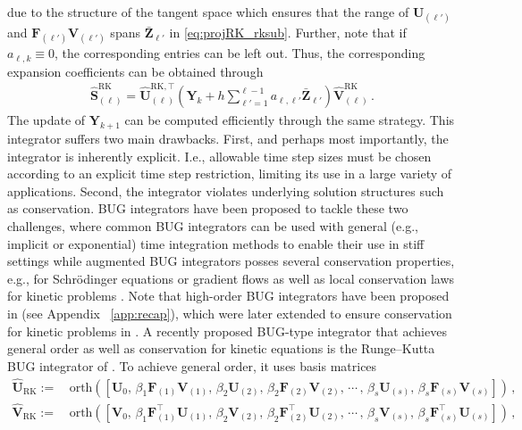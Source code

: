 \documentclass[preprint,runningheads]{svjour3}
\newcommand\bfF{{\mathbf F}}
\newcommand\bfS{{\mathbf S}}
\newcommand\bfU{{\mathbf U}}
\newcommand\bfV{{\mathbf V}}
\newcommand\bfY{{\mathbf Y}}
\newcommand\bfZ{{\mathbf Z}}
\begin{document}
due to the structure of the tangent space which ensures that the range of $\bfU_{(\ell')}$ and $\bfF_{(\ell')}\bfV_{(\ell')}$ spans $\bar \bfZ_{\ell'}$ in \eqref{eq:projRK_rksub}. Further, note that if $a_{\ell,k} \equiv 0$, the corresponding entries can be left out. Thus, the corresponding expansion coefficients can be obtained through
\begin{align*}
    \widehat\bfS_{(\ell)}^{\mathrm{RK}} = \widehat\bfU_{(\ell)}^{\mathrm{RK},\top} \left( \bfY_k + h\sum_{\ell' = 1}^{\ell-1}a_{\ell,\ell'}\bar \bfZ_{\ell'}\right) \widehat\bfV_{(\ell)}^{\mathrm{RK}}\,.
\end{align*}
 {The update of $\bfY_{k+1}$ can be computed efficiently through the same strategy.} This integrator suffers two main drawbacks. First, and perhaps most importantly, the integrator is inherently explicit. I.e., allowable time step sizes must be chosen according to an explicit time step restriction, limiting its use in a large variety of applications. Second, the integrator violates underlying solution structures such as conservation. BUG integrators have been proposed to tackle these two challenges, where common BUG integrators can be used with general (e.g., implicit or exponential) time integration methods to enable their use in stiff settings \cite{CeL22,CeKL22,CeKL23,ceruti2024robust,kusch2024second} while augmented BUG integrators posses several conservation properties, e.g., for Schr\"odinger equations or gradient flows \cite{CeKL22} as well as local conservation laws for kinetic problems \cite{einkemmer2023conservation}. Note that high-order BUG integrators have been proposed in \cite{ceruti2024robust,kusch2024second}  {(see Appendix~ \ref{app:recap})}, which were later extended to ensure conservation for kinetic problems in \cite{einkemmer2023conservation}. A recently proposed BUG-type integrator that achieves general order as well as conservation for kinetic equations is the Runge--Kutta BUG integrator of \cite{nobile2025robust}. To achieve general order, it uses basis matrices 
\begin{subequations}
    \begin{align}
        \widehat\bfU_{\mathrm{RK}} :=\,& \text{orth}([\bfU_0, \,\beta_1\bfF_{(1)}\bfV_{(1)},\,\beta_2\bfU_{(2)}, \,\beta_2\bfF_{(2)}\bfV_{(2)}, \,\cdots \,,\,\beta_s\bfU_{(s)},\,\beta_s\bfF_{(s)}\bfV_{(s)}])\,,\\
        \widehat\bfV_{\mathrm{RK}} :=\,& \text{orth}([\bfV_0, \,\beta_1\bfF_{(1)}^{\top}\bfU_{(1)}, \,\beta_2\bfV_{(2)},\,\beta_2\bfF_{(2)}^{\top}\bfU_{(2)}, \,\cdots\,, \,\beta_s\bfV_{(s)}, \,\beta_s\bfF_{(s)}^{\top}\bfU_{(s)}])\,,
    \end{align}
\end{subequations}
\end{document}
